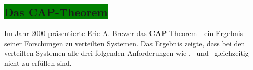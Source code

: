 \subsection{\colorbox{green}{Das CAP-Theorem}}\label{cap}

Im Jahr 2000 präsentierte Eric A. Brewer das \textbf{CAP}-Theorem - ein Ergebnis seiner Forschungen zu verteilten Systemen. Das Ergebnis zeigte, dass bei den verteilten Systemen alle drei folgenden Anforderungen wie \Cap, \cAp\ und \caP\ gleichzeitig nicht zu erfüllen sind.
